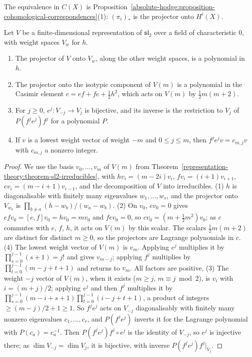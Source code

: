 The equivalence in $C(X)$ is Proposition~\ref{absolute-hodge:proposition-cohomological-correspondences}(1): $(\pi_i)_*$ is the projector onto $H^i(X)$.

\begin{lemma}\label{absolute-hodge:lemma-sl2-polynomials}
Let $V$ be a finite-dimensional representation of $\mathfrak{sl}_2$ over a field of characteristic $0$, with weight spaces $V_w$ for $h$.
\begin{enumerate}
\item The projector of $V$ onto $V_w$, along the other weight spaces, is a polynomial in $h$.
\item The projector onto the isotypic component of $V(m)$ is a polynomial in the Casimir element $c = ef + fe + \frac12h^2$, which acts on $V(m)$ by $\frac12m(m + 2)$.
\item For $j \geq 0$, $e^j \colon V_{-j} \to V_j$ is bijective, and its inverse is the restriction to $V_j$ of $P(f^je^j)f^j$ for a polynomial $P$.
\item If $v$ is a lowest weight vector of weight $-m$ and $0 \leq j \leq m$, then $f^je^jv = c_{m,j}v$ with $c_{m,j}$ a nonzero integer.
\end{enumerate}
\end{lemma}

\begin{proof}
We use the basis $v_0, \ldots, v_m$ of $V(m)$ from Theorem~\ref{representation-theory:theorem-sl2-irreducibles}, with $hv_i = (m - 2i)v_i$, $fv_i = (i + 1)v_{i+1}$, $ev_i = (m - i + 1)v_{i-1}$, and the decomposition of $V$
into irreducibles. (1) $h$ is diagonalisable with finitely many eigenvalues $w_1, \ldots, w_s$, and the projector onto $V_{w_a}$ is $\prod_{b \neq a}(h - w_b)/(w_a - w_b)$. (2) On $v_0$, $ev_0 = 0$ gives
$efv_0 = [e, f]v_0 = hv_0 = mv_0$ and $fev_0 = 0$, so $cv_0 = (m + \frac12m^2)v_0$; as $c$ commutes with $e$, $f$, $h$, it acts on $V(m)$ by this scalar. The scalars $\frac12m(m + 2)$ are distinct for distinct
$m \geq 0$, so the projectors are Lagrange polynomials in $c$. (4) The lowest weight vector of $V(m)$ is $v_m$. Applying $e^j$ multiplies it by $\prod_{s=0}^{j-1}(s + 1) = j!$ and gives $v_{m-j}$; applying $f^j$ multiplies by
$\prod_{t=0}^{j-1}(m - j + t + 1)$ and returns to $v_m$. All factors are positive. (3) The weight $-j$ vector of $V(m)$, when it exists ($m \geq j$, $m \equiv j \bmod 2$), is $v_i$ with $i = (m + j)/2$; applying $e^j$ and
then $f^j$ multiplies it by $\prod_{s=0}^{j-1}(m - i + s + 1)\prod_{t=0}^{j-1}(i - j + t + 1)$, a product of integers $\geq (m - j)/2 + 1 \geq 1$. So $f^je^j$ acts on $V_{-j}$ diagonalisably with finitely many nonzero eigenvalues
$c_1, \ldots, c_r$, and $P(f^je^j)$ inverts it for the Lagrange polynomial with $P(c_a) = c_a^{-1}$. Then $P(f^je^j)f^j \circ e^j$ is the identity of $V_{-j}$, so $e^j$ is injective there; as $\dim V_{-j} = \dim V_j$, it is
bijective, with inverse $P(f^je^j)f^j|_{V_j}$.
\end{proof}

